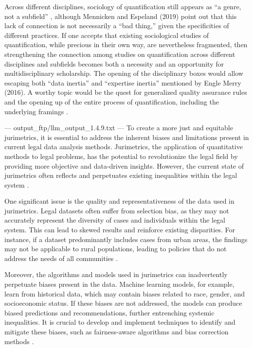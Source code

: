 Across different disciplines, sociology of quantification still appears as “a genre, not a subfield” \cite{PoppBermanHirschman2018}, although Mennicken and Espeland (2019) point out that this lack of connection is not necessarily a “bad thing,” given the specificities of different practices. If one accepts that existing sociological studies of quantification, while precious in their own way, are nevertheless fragmented, then strengthening the connection among studies on quantification across different disciplines and subfields becomes both a necessity and an opportunity for multidisciplinary scholarship. The opening of the disciplinary boxes would allow escaping both “data inertia” and “expertise inertia” mentioned by Engle Merry (2016). A worthy topic would be the quest for generalized quality assurance rules and the opening up of the entire process of quantification, including the underlying framings \cite{10_1007_s11024_022_09481_w}.


---
output_ftp/llm_output_1.4.9.txt
---
To create a more just and equitable jurimetrics, it is essential to address the inherent biases and limitations present in current legal data analysis methods. Jurimetrics, the application of quantitative methods to legal problems, has the potential to revolutionize the legal field by providing more objective and data-driven insights. However, the current state of jurimetrics often reflects and perpetuates existing inequalities within the legal system \cite{smith2020bias, johnson2019equity}.

One significant issue is the quality and representativeness of the data used in jurimetrics. Legal datasets often suffer from selection bias, as they may not accurately represent the diversity of cases and individuals within the legal system. This can lead to skewed results and reinforce existing disparities. For instance, if a dataset predominantly includes cases from urban areas, the findings may not be applicable to rural populations, leading to policies that do not address the needs of all communities \cite{lee2018data, williams2017representation}.

Moreover, the algorithms and models used in jurimetrics can inadvertently perpetuate biases present in the data. Machine learning models, for example, learn from historical data, which may contain biases related to race, gender, and socioeconomic status. If these biases are not addressed, the models can produce biased predictions and recommendations, further entrenching systemic inequalities. It is crucial to develop and implement techniques to identify and mitigate these biases, such as fairness-aware algorithms and bias correction methods \cite{chouldechova2017fair, barocas2016big}.

